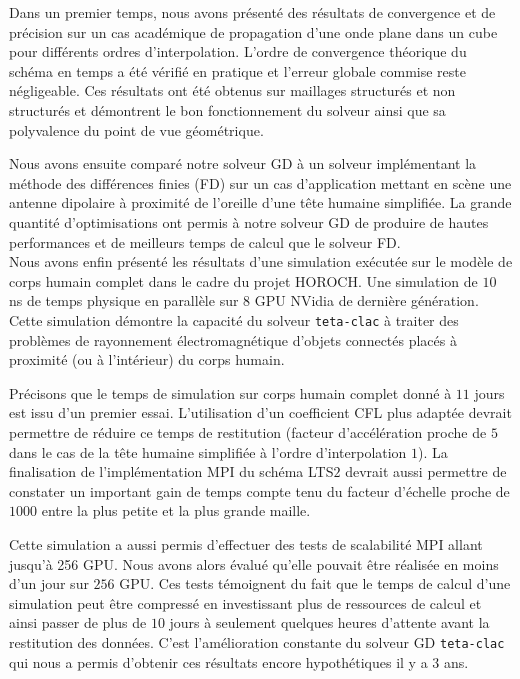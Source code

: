 Dans un premier temps, nous avons présenté des résultats de convergence
et de précision
sur un cas académique de propagation d'une onde plane dans un cube
pour différents ordres d'interpolation.
L'ordre de convergence théorique du schéma en temps a été vérifié
en pratique et l'erreur globale commise reste négligeable.
Ces résultats ont été obtenus sur maillages structurés et non structurés
et démontrent le bon fonctionnement du solveur ainsi que sa
polyvalence du point de vue géométrique.

Nous avons ensuite comparé notre solveur GD à un solveur implémentant
la méthode des différences finies (FD) sur un cas d'application
mettant en scène une antenne dipolaire à proximité de l'oreille d'une tête
humaine simplifiée.
La grande quantité d'optimisations ont permis à notre solveur GD
de produire de hautes performances et de meilleurs temps de calcul
que le solveur FD.
\\

Nous avons enfin présenté les résultats d'une simulation exécutée
sur le modèle de corps humain complet dans le cadre du projet HOROCH.
Une simulation de $10$ ns de temps physique en parallèle sur
$8$ GPU NVidia de dernière génération.
Cette simulation démontre la capacité du solveur \texttt{teta-clac}
à traiter des problèmes de rayonnement
électromagnétique d'objets connectés placés à proximité
(ou à l'intérieur) du corps humain.

Précisons que le temps de simulation sur corps humain complet
donné à $11$ jours est issu d'un premier essai.
L'utilisation d'un coefficient CFL plus adaptée devrait permettre
de réduire ce temps de restitution (facteur d'accélération proche de $5$ dans le
cas de la tête humaine simplifiée à l'ordre d'interpolation $1$).
La finalisation de l'implémentation MPI du schéma LTS$2$ devrait
aussi permettre de constater un important gain de temps compte tenu
du facteur d'échelle proche de $1000$ entre la plus petite et
la plus grande maille.

Cette simulation a aussi permis d'effectuer des tests de
scalabilité MPI allant jusqu'à 256 GPU.
Nous avons alors évalué qu'elle pouvait être réalisée
en moins d'un jour sur $256$ GPU.
Ces tests témoignent du fait que le temps de calcul
d'une simulation peut être compressé en investissant plus
de ressources de calcul et ainsi passer de plus de $10$ jours
à seulement quelques heures d'attente avant la restitution des données.
C'est l'amélioration constante du solveur GD \texttt{teta-clac}
qui nous a permis d'obtenir ces résultats encore hypothétiques
il y a $3$ ans.
\\



